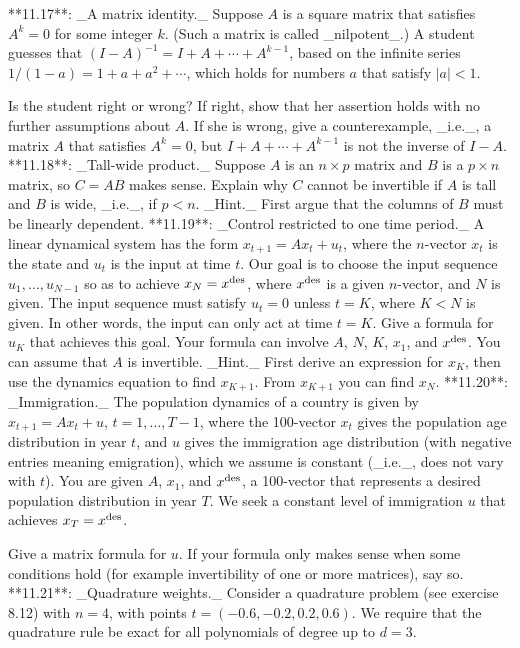 

**11.17**: _A matrix identity._ Suppose \(A\) is a square matrix that satisfies \(A^{k}=0\) for some integer \(k\). (Such a matrix is called _nilpotent_.) A student guesses that \((I-A)^{-1}=I+A+\cdots+A^{k-1}\), based on the infinite series \(1/(1-a)=1+a+a^{2}+\cdots\), which holds for numbers \(a\) that satisfy \(|a|<1\).

Is the student right or wrong? If right, show that her assertion holds with no further assumptions about \(A\). If she is wrong, give a counterexample, _i.e._, a matrix \(A\) that satisfies \(A^{k}=0\), but \(I+A+\cdots+A^{k-1}\) is not the inverse of \(I-A\).
**11.18**: _Tall-wide product._ Suppose \(A\) is an \(n\times p\) matrix and \(B\) is a \(p\times n\) matrix, so \(C=AB\) makes sense. Explain why \(C\) cannot be invertible if \(A\) is tall and \(B\) is wide, _i.e._, if \(p<n\). _Hint._ First argue that the columns of \(B\) must be linearly dependent.
**11.19**: _Control restricted to one time period._ A linear dynamical system has the form \(x_{t+1}=Ax_{t}+u_{t}\), where the \(n\)-vector \(x_{t}\) is the state and \(u_{t}\) is the input at time \(t\). Our goal is to choose the input sequence \(u_{1},\ldots,u_{N-1}\) so as to achieve \(x_{N}=x^{\rm des}\), where \(x^{\rm des}\) is a given \(n\)-vector, and \(N\) is given. The input sequence must satisfy \(u_{t}=0\) unless \(t=K\), where \(K<N\) is given. In other words, the input can only act at time \(t=K\). Give a formula for \(u_{K}\) that achieves this goal. Your formula can involve \(A\), \(N\), \(K\), \(x_{1}\), and \(x^{\rm des}\). You can assume that \(A\) is invertible. _Hint._ First derive an expression for \(x_{K}\), then use the dynamics equation to find \(x_{K+1}\). From \(x_{K+1}\) you can find \(x_{N}\).
**11.20**: _Immigration._ The population dynamics of a country is given by \(x_{t+1}=Ax_{t}+u\), \(t=1,\ldots,T-1\), where the 100-vector \(x_{t}\) gives the population age distribution in year \(t\), and \(u\) gives the immigration age distribution (with negative entries meaning emigration), which we assume is constant (_i.e._, does not vary with \(t\)). You are given \(A\), \(x_{1}\), and \(x^{\rm des}\), a 100-vector that represents a desired population distribution in year \(T\). We seek a constant level of immigration \(u\) that achieves \(x_{T}=x^{\rm des}\).

Give a matrix formula for \(u\). If your formula only makes sense when some conditions hold (for example invertibility of one or more matrices), say so.
**11.21**: _Quadrature weights._ Consider a quadrature problem (see exercise 8.12) with \(n=4\), with points \(t=(-0.6,-0.2,0.2,0.6)\). We require that the quadrature rule be exact for all polynomials of degree up to \(d=3\).

